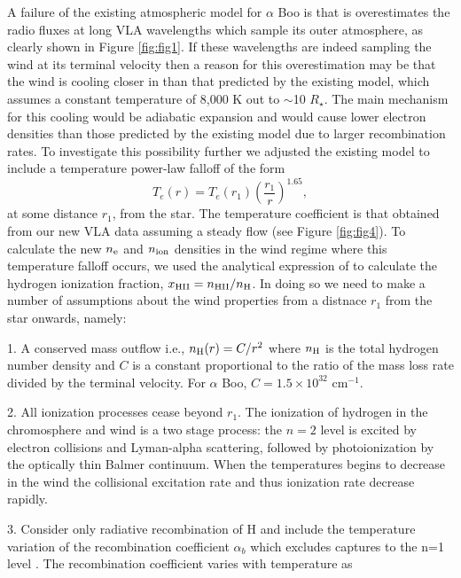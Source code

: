 \documentclass[iop]{emulateapj}
\begin{document}
A failure of the existing atmospheric model for $\alpha$ Boo is that is overestimates the radio fluxes at long VLA wavelengths which sample its outer atmosphere, as clearly shown in Figure \ref{fig:fig1}. If these wavelengths are indeed sampling the wind at its terminal velocity then a reason for this overestimation may be that the wind is cooling closer in than that predicted by the existing model, which assumes a constant temperature of 8,000 K out to $\sim$10 $R_{\star}$. The main mechanism for this cooling would be adiabatic expansion \citep{2011ASPC..448..691O} and would cause lower electron densities than those predicted by the existing model due to larger recombination rates. To investigate this possibility further we adjusted the existing model to include a temperature power-law falloff of the form
\begin{equation}
T_{e}(r)= T_{e}(r_{1})\left(\frac{r_{1}}{r}\right)^{1.65},
\label{eq:eq2}
\end{equation}
at some distance $r_{1}$, from the star. The temperature coefficient is that obtained from our new VLA data assuming a steady flow (see Figure \ref{fig:fig4}). To calculate the new $n_{\rm{e}}$ and $n_{\rm{ion}}$ densities in the wind regime where this temperature falloff occurs, we used the analytical expression of \cite{1986ApJ...306..605G} to calculate the hydrogen ionization fraction, $x_{\rm{HII}}=n_{\rm{HII}}/n_{\rm{H}}$. In doing so we need to make a number of assumptions about the wind properties from a distnace $r_{1}$ from the star onwards, namely:
\item 1. A conserved mass outflow i.e., $n_{\rm{H}}(r)=C/r^2$ where $n_{\rm{H}}$ is the total hydrogen number density and $C$ is a constant proportional to the ratio of the mass loss rate divided by the terminal velocity. For $\alpha$ Boo, $C = 1.5 \times 10^{32} $ cm$^{-1}$.
\item 2. All ionization processes cease beyond $r_{1}$. The ionization of hydrogen in the chromosphere and wind is a two stage process: the $n = 2$ level is excited by electron collisions and Lyman-alpha scattering, followed by photoionization by the optically thin Balmer continuum. When the temperatures begins to decrease in the wind the collisional excitation rate and thus ionization rate decrease rapidly.
\item 3. Consider only radiative recombination of H and include the temperature variation of the recombination coefficient $\alpha _{b}$ which excludes captures to the n=1 level \citep{1978ppim.book.....S}. The recombination coefficient varies with temperature as
\end{document}
